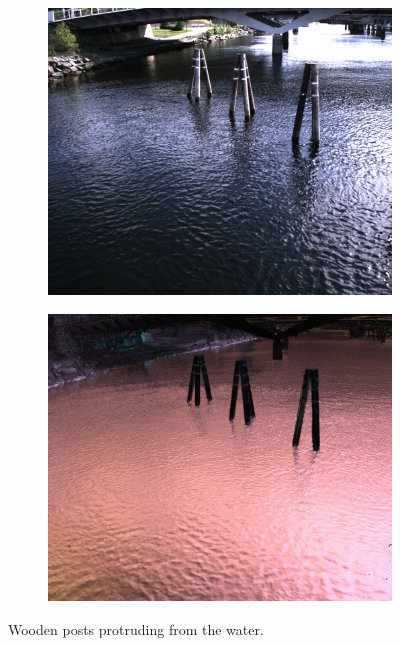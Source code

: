 \begin{figure}[H]
    \begin{subfigure}[T]{.49\textwidth}
        \includegraphics[width=\textwidth]{figures/pictures/img_7458_s0.jpg}
    \end{subfigure} \hfill
    \begin{subfigure}[T]{.49\textwidth}
        \includegraphics[width=\textwidth]{figures/pictures/img_7458_pol.jpg}
    \end{subfigure}
    \caption{Wooden posts protruding from the water.}
\end{figure}
\vspace{-.5cm}


